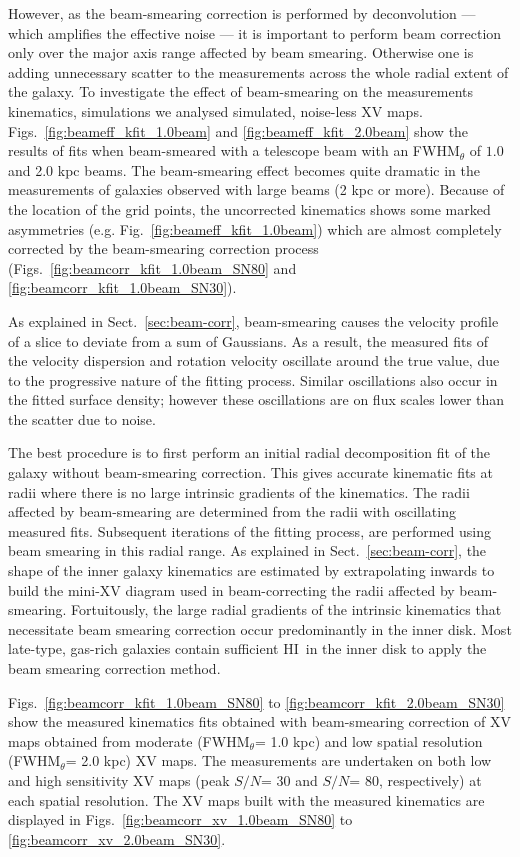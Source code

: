 \documentclass[traditabstract]{aa} %
\newcommand\HI{H{\small I}}
\begin{document}
However, as the beam-smearing correction is performed by deconvolution
--- which amplifies the effective noise --- it is important to perform
beam correction only over the major axis range affected by beam
smearing. Otherwise one is adding unnecessary scatter to the
measurements across the whole radial extent of the galaxy. To
investigate the effect of beam-smearing on the measurements kinematics, 
simulations we analysed simulated, noise-less XV maps.
Figs.~\ref{fig:beameff_kfit_1.0beam} and \ref{fig:beameff_kfit_2.0beam}
show the results of fits when beam-smeared with a telescope beam
with  an FWHM$_{\theta}$ of $1.0$ and 2.0 kpc beams.  The beam-smearing
effect becomes quite dramatic in the measurements of galaxies
observed with large beams (2 kpc or more). 
Because of the location of the grid points,
the uncorrected kinematics shows some marked asymmetries (e.g. 
Fig.~\ref{fig:beameff_kfit_1.0beam})
which are almost completely corrected by the beam-smearing correction
process (Figs.~\ref{fig:beamcorr_kfit_1.0beam_SN80} and 
\ref{fig:beamcorr_kfit_1.0beam_SN30}).


As explained in Sect.~\ref{sec:beam-corr}, beam-smearing causes the
velocity profile of a slice to deviate from a sum of Gaussians. 
As a result, the measured fits
of the velocity dispersion and rotation velocity oscillate around the
true value, due to the progressive nature of the fitting
process. Similar oscillations also occur in the fitted surface density; however 
these oscillations are on flux scales lower than the scatter due to noise.

The best procedure is to first perform an
initial radial decomposition fit of the galaxy without beam-smearing
correction. This gives accurate kinematic fits at radii where there
is no large intrinsic gradients of the kinematics. The radii affected
by beam-smearing are determined from the radii with oscillating measured fits. 
Subsequent iterations of the fitting process, are performed using beam smearing 
in this radial range. As
explained in Sect.~\ref{sec:beam-corr}, the shape of the inner
galaxy kinematics are estimated by extrapolating inwards to build the
mini-XV diagram used in beam-correcting the radii affected by beam-smearing.
Fortuitously, the large radial gradients of the intrinsic kinematics 
that necessitate beam smearing correction occur predominantly in the 
inner disk. Most late-type, gas-rich galaxies contain sufficient \HI\ 
in the inner disk to apply the beam smearing correction method. 

Figs.~\ref{fig:beamcorr_kfit_1.0beam_SN80}
to \ref{fig:beamcorr_kfit_2.0beam_SN30} show the measured
kinematics fits obtained with beam-smearing correction of XV maps
obtained from moderate (FWHM$_{\theta}$= 1.0 kpc) and low spatial
resolution (FWHM$_{\theta}$= 2.0 kpc) XV maps. The measurements are
undertaken on both low and high sensitivity XV maps (peak $S/N$= 30 and
$S/N$= 80, respectively) at each spatial resolution. The XV maps built
with the measured kinematics are displayed in
Figs.~\ref{fig:beamcorr_xv_1.0beam_SN80} to
\ref{fig:beamcorr_xv_2.0beam_SN30}.
\end{document}
